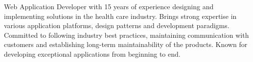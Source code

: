 

\begin{cvparagraph}

Web Application Developer with 15 years of experience designing and implementing solutions in the health care industry. Brings strong expertise in various application platforms, design patterns and development paradigms. Committed to following industry best practices, maintaining communication with customers and establishing long-term maintainability of the products. Known for developing exceptional applications from beginning to end.
\end{cvparagraph}
